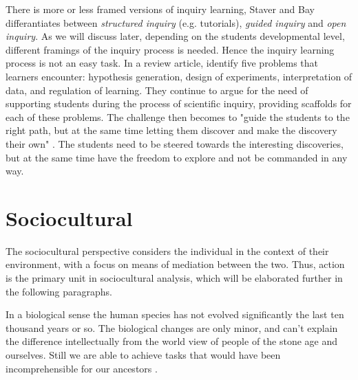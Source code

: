 There is more or less framed versions of inquiry learning, Staver and Bay \citetext{(1987) referenced in \citealp{prince2006inductive}} differantiates between \emph{structured inquiry} (e.g. tutorials), \emph{guided inquiry} and \emph{open inquiry}. As we will discuss later, depending on the students developmental level, different framings of the inquiry process is needed. Hence the inquiry learning process is not an easy task. In a review article, \citet{de1998scientific} identify five problems that learners encounter: hypothesis generation, design of experiments, interpretation of data, and regulation of learning. They continue to argue for the need of supporting students during the process of scientific inquiry, providing scaffolds for each of these problems. The challenge then becomes to "guide the students to the right path, but at the same time letting them discover and make the discovery their own" \citep{kluge2010simulation}. The students need to be steered towards the interesting discoveries, but at the same time have the freedom to explore and not be commanded in any way. 
 

\section{Sociocultural}


The sociocultural perspective considers the individual in the context of their environment, with a focus on means of mediation between the two. Thus, action is the primary unit in sociocultural analysis, which will be elaborated further in the following paragraphs. 


In a biological sense the human species has not evolved significantly the last ten thousand years or so. The biological changes are only minor, and can’t explain the difference intellectually from the world view of people of the stone age and ourselves. Still we are able to achieve tasks that would have been incomprehensible for our ancestors \citep{saljo2001laering}.

